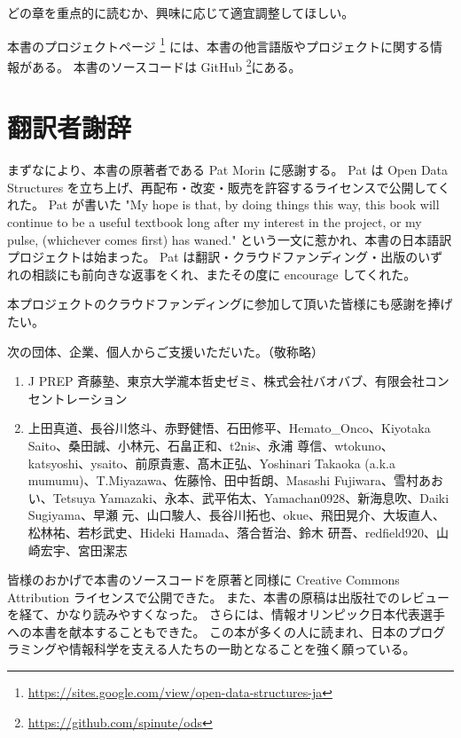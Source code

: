 どの章を重点的に読むか、興味に応じて適宜調整してほしい。

本書のプロジェクトページ \footnote {\url{https://sites.google.com/view/open-data-structures-ja}} には、本書の他言語版やプロジェクトに関する情報がある。
本書のソースコードは GitHub \footnote {\url{https://github.com/spinute/ods}}にある。

\chapter*{翻訳者謝辞}

まずなにより、本書の原著者である Pat Morin に感謝する。
Pat は Open Data Structures を立ち上げ、再配布・改変・販売を許容するライセンスで公開してくれた。
Pat が書いた "My hope is that, by doing things this way, this book will continue to be a useful textbook long after my interest in the project, or my pulse, (whichever comes first) has waned." という一文に惹かれ、本書の日本語訳プロジェクトは始まった。
Pat は翻訳・クラウドファンディング・出版のいずれの相談にも前向きな返事をくれ、またその度に encourage してくれた。

本プロジェクトのクラウドファンディングに参加して頂いた皆様にも感謝を捧げたい。

次の団体、企業、個人からご支援いただいた。（敬称略）
\begin{enumerate}
\item J PREP 斉藤塾、東京大学瀧本哲史ゼミ、株式会社バオバブ、有限会社コンセントレーション
\item 上田真道、長谷川悠斗、赤野健悟、石田修平、Hemato\_Onco、Kiyotaka Saito、桑田誠、小林元、石畠正和、t2nis、永浦 尊信、wtokuno、katsyoshi、ysaito、前原貴憲、髙木正弘、Yoshinari Takaoka (a.k.a mumumu)、T.Miyazawa、佐藤怜、田中哲朗、Masashi Fujiwara、雪村あおい、Tetsuya Yamazaki、永本、武平佑太、Yamachan0928、新海息吹、Daiki Sugiyama、早瀬 元、山口駿人、長谷川拓也、okue、飛田晃介、大坂直人、松林祐、若杉武史、Hideki Hamada、落合哲治、鈴木 研吾、redfield920、山崎宏宇、宮田潔志
\end{enumerate}

皆様のおかげで本書のソースコードを原著と同様に Creative Commons Attribution ライセンスで公開できた。
また、本書の原稿は出版社でのレビューを経て、かなり読みやすくなった。
さらには、情報オリンピック日本代表選手への本書を献本することもできた。
この本が多くの人に読まれ、日本のプログラミングや情報科学を支える人たちの一助となることを強く願っている。

